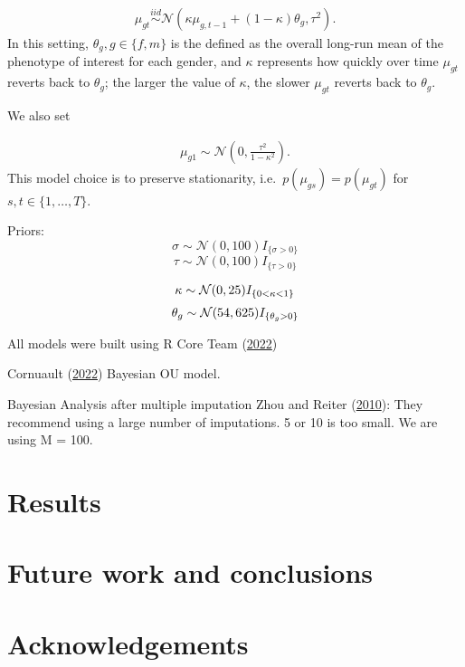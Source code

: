 \documentclass[
  12pt,
]{article}
\begin{document}
\[
\begin{aligned}
\mu_{gt} \overset{iid}{\sim}\mathcal{N}(\kappa \mu_{g,t-1} + (1 - \kappa)\theta_g, \tau^2).
\end{aligned}
\] In this setting, \(\theta_g, g \in \{f,m\}\) is the defined as the
overall long-run mean of the phenotype of interest for each gender, and
\(\kappa\) represents how quickly over time \(\mu_{gt}\) reverts back to
\(\theta_g\); the larger the value of \(\kappa\), the slower
\(\mu_{gt}\) reverts back to \(\theta_g\).

We also set

\[
\begin{aligned}
\mu_{g1} \sim \mathcal{N}\left(0,\frac{\tau^2}{1-\kappa^2}\right).
\end{aligned}
\] This model choice is to preserve stationarity,
i.e.~\(p(\mu_{gs}) = p(\mu_{gt})\) for \(s,t \in \{1,\dots,T\}\).

Priors: \[
\sigma \sim \mathcal{N}(0,100)I_{\{\sigma > 0\}}
\] \[
\tau \sim \mathcal{N}(0,100)I_{\{\tau > 0\}}
\]

\[
\kappa \sim \mathcal{N}(0,25)I_{\{0 < \kappa < 1\}} \\
\] \[
\theta_g \sim \mathcal{N}(54,625)I_{\{\theta_g > 0\}} \\
\]

All models were built using R Core Team
(\protect\hyperlink{ref-R2022language}{2022})

Cornuault (\protect\hyperlink{ref-Cornault2022}{2022}) Bayesian OU
model.

Bayesian Analysis after multiple imputation Zhou and Reiter
(\protect\hyperlink{ref-ZhouReiter2009}{2010}): They recommend using a
large number of imputations. 5 or 10 is too small. We are using M = 100.

\hypertarget{sec:results}{%
\section{Results}\label{sec:results}}

\hypertarget{sec:conclusions}{%
\section{Future work and conclusions}\label{sec:conclusions}}

\hypertarget{acknowledgements}{%
\section*{Acknowledgements}\label{acknowledgements}}
\end{document}
